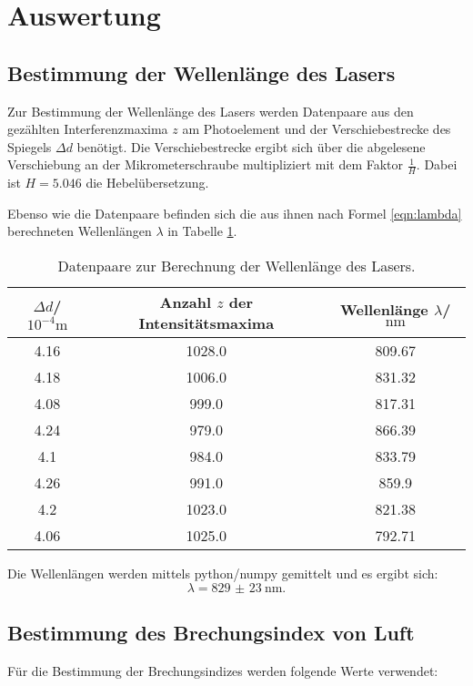 \section{Auswertung}
\label{sec:Auswertung}
\subsection{Bestimmung der Wellenlänge des Lasers}
Zur Bestimmung der Wellenlänge des Lasers werden Datenpaare aus den gezählten Interferenzmaxima $z$ am Photoelement und der Verschiebestrecke des Spiegels $\Delta d$ benötigt.
Die Verschiebestrecke ergibt sich über die abgelesene Verschiebung an der Mikrometerschraube multipliziert mit dem Faktor $\frac{1}{H}$.
Dabei ist $H=5.046$ die Hebelübersetzung.

Ebenso wie die Datenpaare befinden sich die aus ihnen nach Formel \eqref{eqn:lambda} berechneten Wellenlängen $\lambda $ in Tabelle \ref{tab:spieglein}.
\begin{table}
  \caption{Datenpaare zur Berechnung der Wellenlänge des Lasers.}
  \label{tab:spieglein}
  \centering
\begin{tabular}{ccc}
  \toprule
$\Delta d$/$10^{-4}\si{\meter}$ & Anzahl $z$ der Intensitätsmaxima & Wellenlänge $\lambda$/$\si{\nano\meter}$ \\
\midrule
4.16 & 1028.0 & 809.67 \\
4.18 & 1006.0 & 831.32 \\
4.08 & 999.0 & 817.31 \\
4.24 & 979.0 & 866.39 \\
4.1 & 984.0 & 833.79 \\
4.26 & 991.0 & 859.9 \\
4.2 & 1023.0 & 821.38 \\
4.06 & 1025.0 & 792.71 \\
\bottomrule
\end{tabular}
\end{table}


Die Wellenlängen werden mittels python/numpy \cite{numpy} gemittelt und es ergibt sich:
\begin{equation}
\lambda=  \SI{829(23)}{\nano\meter} \text{.}
\end{equation}

\subsection{Bestimmung des Brechungsindex von Luft}

Für die Bestimmung der Brechungsindizes werden folgende Werte verwendet:

